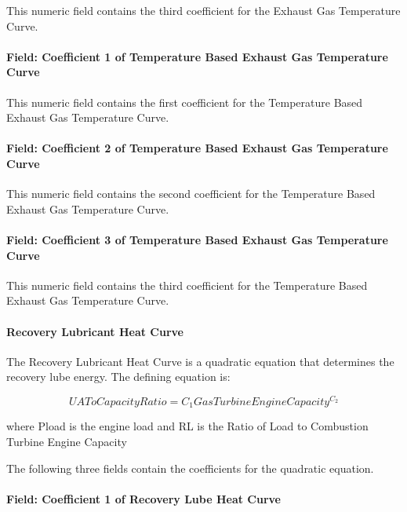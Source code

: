 This numeric field contains the third coefficient for the Exhaust Gas Temperature Curve.

\paragraph{Field: Coefficient 1 of Temperature Based Exhaust Gas Temperature Curve}\label{field-coefficient-1-of-temperature-based-exhaust-gas-temperature-curve}

This numeric field contains the first coefficient for the Temperature Based Exhaust Gas Temperature Curve.

\paragraph{Field: Coefficient 2 of Temperature Based Exhaust Gas Temperature Curve}\label{field-coefficient-2-of-temperature-based-exhaust-gas-temperature-curve}

This numeric field contains the second coefficient for the Temperature Based Exhaust Gas Temperature Curve.

\paragraph{Field: Coefficient 3 of Temperature Based Exhaust Gas Temperature Curve}\label{field-coefficient-3-of-temperature-based-exhaust-gas-temperature-curve}

This numeric field contains the third coefficient for the Temperature Based Exhaust Gas Temperature Curve.

\paragraph{Recovery Lubricant Heat Curve}\label{recovery-lubricant-heat-curve}

The Recovery Lubricant Heat Curve is a quadratic equation that determines the recovery lube energy. The defining equation is:

\begin{equation}
    UAToCapacityRatio = {C_1}GasTurbineEngineCapacit{y^{{C_2}}}
\end{equation}

where Pload is the engine load and RL is the Ratio of Load to Combustion Turbine Engine Capacity

The following three fields contain the coefficients for the quadratic equation.

\paragraph{Field: Coefficient 1 of Recovery Lube Heat Curve}\label{field-coefficient-1-of-recovery-lube-heat-curve}

